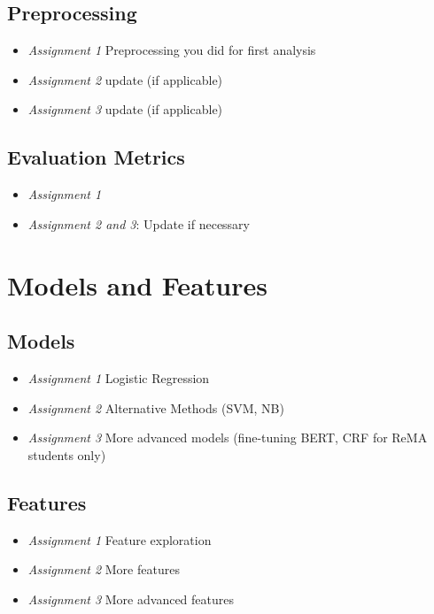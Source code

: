 \documentclass[11pt]{article}
\begin{document}
\subsection{Preprocessing}

\begin{itemize}
    \item[] \textit{Assignment 1} Preprocessing you did for first analysis
    \item[] \textit{Assignment 2} update (if applicable)
     \item[] \textit{Assignment 3} update (if applicable)
\end{itemize}



\subsection{Evaluation Metrics}

\begin{itemize}
    \item[] \textit{Assignment 1}
    \item[] \textit{Assignment 2 and 3}: Update if necessary
\end{itemize}



\section{Models and Features}

\subsection{Models}

\begin{itemize}
    \item[] \textit{Assignment 1} Logistic Regression
    \item[]\textit{Assignment 2} Alternative Methods (SVM, NB)
    \item[]\textit{Assignment 3} More advanced models (fine-tuning BERT, CRF for ReMA students only)
\end{itemize}


\subsection{Features}

\begin{itemize}
    \item[] \textit{Assignment 1} Feature exploration 
    \item[] \textit{Assignment 2} More features
    \item[] \textit{Assignment 3} More advanced features 
\end{itemize}
\end{document}
